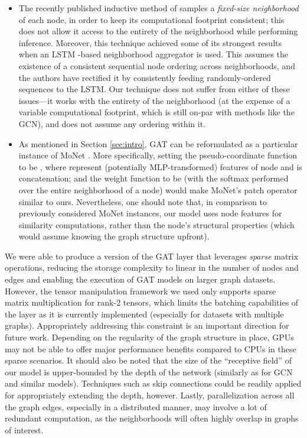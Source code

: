 \documentclass{article} \usepackage{iclr2018_conference,times}
\begin{document}
\begin{itemize}
    \item The recently published inductive method of \cite{hamilton2017inductive} samples a \emph{fixed-size neighborhood} of each node, in order to keep its computational footprint consistent; this does not allow it access to the entirety of the neighborhood while performing inference. Moreover, this technique achieved some of its strongest results when an LSTM \citep{hochreiter1997long}-based neighborhood aggregator is used. This assumes the existence of a consistent sequential node ordering across neighborhoods, and the authors have rectified it by consistently feeding randomly-ordered sequences to the LSTM. Our technique does not suffer from either of these issues---it works with the entirety of the neighborhood (at the expense of a variable computational footprint, which is still on-par with methods like the GCN), and does not assume any ordering within it.
    \item As mentioned in Section \ref{sec:intro}, GAT can be reformulated as a particular instance of MoNet \citep{monti2016geometric}. More specifically, setting the pseudo-coordinate function to be , where  represent (potentially MLP-transformed) features of node  and  is concatenation; and the weight function to be  (with the softmax performed over the entire neighborhood of a node) would make MoNet's patch operator similar to ours. Nevertheless, one should note that, in comparison to previously considered MoNet instances, our model uses node features for similarity computations, rather than the node's structural properties (which would assume knowing the graph structure upfront). 


\end{itemize}
We were able to produce a version of the GAT layer that leverages \emph{sparse} matrix operations, reducing the storage complexity to linear in the number of nodes and edges and enabling the execution of GAT models on larger graph datasets. However, the tensor manipulation framework we used only supports sparse matrix multiplication for rank-2 tensors, which limits the batching capabilities of the layer as it is currently implemented (especially for datasets with multiple graphs). Appropriately addressing this constraint is an important direction for future work. Depending on the regularity of the graph structure in place, GPUs may not be able to offer major performance benefits compared to CPUs in these sparse scenarios. It should also be noted that the size of the ``receptive field'' of our model is upper-bounded by the depth of the network (similarly as for GCN and similar models). Techniques such as skip connections \citep{he2016deep} could be readily applied for appropriately extending the depth, however. Lastly, parallelization across all the graph edges, especially in a distributed manner, may involve a lot of redundant computation, as the neighborhoods will often highly overlap in graphs of interest.
\end{document}
